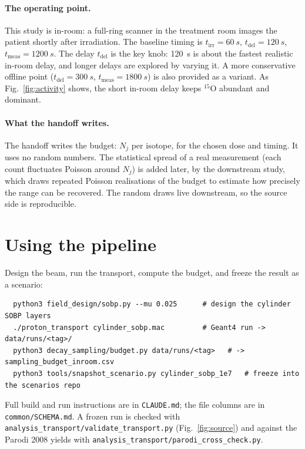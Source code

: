 \documentclass[11pt]{article}
\newcommand{\Ox}[1]{{}^{#1}\mathrm{O}}
\begin{document}
\paragraph{The operating point.}
This study is in-room: a full-ring scanner in the treatment room images the
patient shortly after irradiation. The baseline timing is
$t_{\mathrm{irr}}=\SI{60}{s}$, $t_{\mathrm{del}}=\SI{120}{s}$,
$t_{\mathrm{meas}}=\SI{1200}{s}$. The delay $t_{\mathrm{del}}$ is the key knob:
\SI{120}{s} is about the fastest realistic in-room delay, and longer delays are
explored by varying it. A more conservative offline point
($t_{\mathrm{del}}=\SI{300}{s}$, $t_{\mathrm{meas}}=\SI{1800}{s}$) is also provided as
a variant. As Fig.~\ref{fig:activity} shows, the short in-room delay keeps $\Ox{15}$
abundant and dominant.

\paragraph{What the handoff writes.}
The handoff writes the budget: $N_j$ per isotope, for the chosen dose and timing. It
uses no random numbers. The statistical spread of a real measurement (each count
fluctuates Poisson around $N_j$) is added later, by the downstream study, which draws
repeated Poisson realisations of the budget to estimate how precisely the range can be
recovered. The random draws live downstream, so the source side is reproducible.

\section{Using the pipeline}
\label{sec:using}

Design the beam, run the transport, compute the budget, and freeze the result as a
scenario:
\begin{verbatim}
  python3 field_design/sobp.py --mu 0.025      # design the cylinder SOBP layers
  ./proton_transport cylinder_sobp.mac         # Geant4 run -> data/runs/<tag>/
  python3 decay_sampling/budget.py data/runs/<tag>   # -> sampling_budget_inroom.csv
  python3 tools/snapshot_scenario.py cylinder_sobp_1e7   # freeze into the scenarios repo
\end{verbatim}
Full build and run instructions are in \texttt{CLAUDE.md}; the file columns are in
\texttt{common/SCHEMA.md}. A frozen run is checked with
\texttt{analysis\_transport/validate\_transport.py} (Fig.~\ref{fig:source}) and against
the Parodi 2008 yields with \texttt{analysis\_transport/parodi\_cross\_check.py}.
\end{document}
